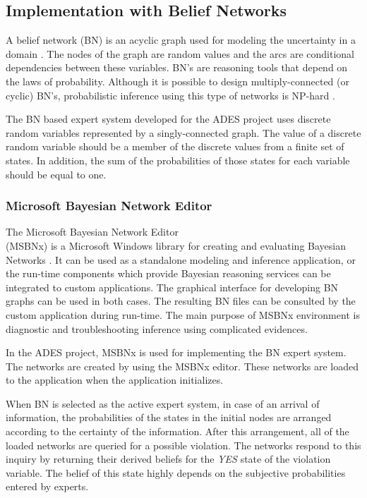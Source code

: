 \documentclass[a4paper,oneside,12pt]{report}
\begin{document}
\subsection{Implementation with Belief Networks}

A belief network (BN) is an acyclic graph used for modeling the uncertainty in a domain \cite{pearl_fusion_1986}. The nodes of the graph are random values and the arcs are conditional dependencies between these variables. BN's are reasoning tools that depend on the laws of probability. Although it is possible to design multiply-connected (or cyclic) BN's, probabilistic inference using this type of networks is NP-hard \cite{cooper_computational_1990}.

The BN based expert system developed for the ADES project uses discrete random variables represented by a singly-connected graph. The value of a discrete random variable should be a member of the discrete values from a finite set of states. In addition, the sum of the probabilities of those states for each variable should be equal to one.

\subsubsection {Microsoft Bayesian Network Editor}
The Microsoft Bayesian Network Editor \\
\noindent (MSBNx) is a Microsoft Windows library for creating and evaluating Bayesian Networks \cite{kadie_msbnx:_2001}. It can be used as a standalone modeling and inference application, or the run-time components which provide Bayesian reasoning services can be integrated to custom applications. The graphical interface for developing BN graphs can be used in both cases. The resulting BN files can be consulted by the custom application during run-time. The main purpose of MSBNx environment is diagnostic and troubleshooting inference using complicated evidences.

In the ADES project, MSBNx is used for implementing the BN expert system. The networks are created by using the MSBNx editor. These networks are loaded to the application when the application initializes. 


When BN is selected as the active expert system, in case of an arrival of information, the probabilities of the states in the initial nodes are arranged according to the certainty of the information. After this arrangement, all of the loaded networks are queried for a possible violation. The networks respond to this inquiry by returning their derived beliefs for the \textit{YES} state of the violation variable. The belief of this state highly depends on the subjective probabilities entered by experts.
\end{document}
